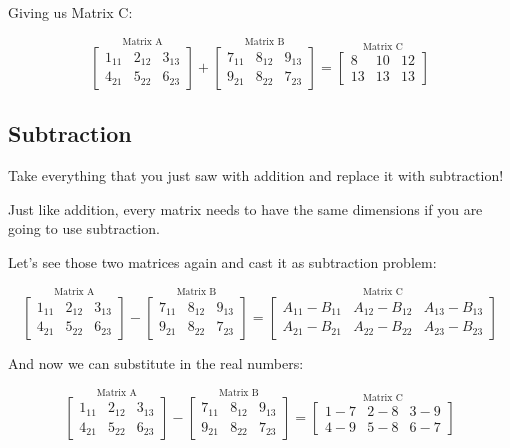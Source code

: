 \documentclass[
]{krantz}
\begin{document}
Giving us Matrix C:

\[
\stackrel{\mbox{Matrix A}}{
\begin{bmatrix}
1_{11} & 2_{12} & 3_{13}\\
4_{21} & 5_{22} & 6_{23}
\end{bmatrix}
}  
+ 
\stackrel{\mbox{Matrix B}}{
\begin{bmatrix}
7_{11} & 8_{12} & 9_{13}\\
9_{21} & 8_{22} & 7_{23}
\end{bmatrix} 
}
=
\stackrel{\mbox{Matrix C}}{
\begin{bmatrix}
8 & 10 & 12 \\
13 & 13 & 13
\end{bmatrix}
}
\]

\hypertarget{subtraction}{%
\subsection{Subtraction}\label{subtraction}}

Take everything that you just saw with addition and replace it with
subtraction!

Just like addition, every matrix needs to have the same dimensions if
you are going to use subtraction.

Let's see those two matrices again and cast it as subtraction problem:

\[
\stackrel{\mbox{Matrix A}}{
\begin{bmatrix}
1_{11} & 2_{12} & 3_{13}\\
4_{21} & 5_{22} & 6_{23}
\end{bmatrix}
}
-
\stackrel{\mbox{Matrix B}}{
\begin{bmatrix}
7_{11} & 8_{12} & 9_{13}\\
9_{21} & 8_{22} & 7_{23}
\end{bmatrix} 
}
=
\stackrel{\mbox{Matrix C}}{
\begin{bmatrix}
A_{11} - B_{11}& A_{12} - B_{12} & A_{13} - B_{13}\\
A_{21} - B_{21}& A_{22} - B_{22} & A_{23} - B_{23}
\end{bmatrix}
}
\]

And now we can substitute in the real numbers:

\[
\stackrel{\mbox{Matrix A}}{
\begin{bmatrix}
1_{11} & 2_{12} & 3_{13}\\
4_{21} & 5_{22} & 6_{23}
\end{bmatrix}
}
-
\stackrel{\mbox{Matrix B}}{
\begin{bmatrix}
7_{11} & 8_{12} & 9_{13}\\
9_{21} & 8_{22} & 7_{23}
\end{bmatrix} 
}
=
\stackrel{\mbox{Matrix C}}{
\begin{bmatrix}
1 - 7 & 2 - 8 & 3 - 9\\
4 - 9 & 5 - 8 & 6 - 7
\end{bmatrix}
}
\]
\end{document}
